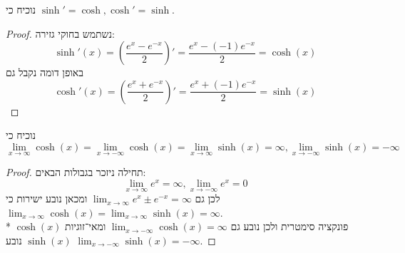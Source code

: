 \Subquestion{}
נוכיח כי $\sinh' = \cosh, \cosh' = \sinh$.
\begin{proof}
	נשתמש בחוקי גזירה:
	\[
		\sinh'(x) = \left( \frac{e^x - e^{-x}}{2}\right)'
		= \frac{e^x - (-1)e^{-x}}{2}
		= \cosh(x)
	\]
	באופן דומה נקבל גם
	\[
		\cosh'(x) = \left( \frac{e^x + e^{-x}}{2}\right)'
		= \frac{e^x + (-1)e^{-x}}{2}
		= \sinh(x)
	\]
\end{proof}

\Subquestion{}
נוכיח כי
\[
	\lim_{x \to \infty} \cosh(x)
	= \lim_{x \to -\infty} \cosh(x)
	= \lim_{x \to \infty} \sinh(x)
	= \infty,
	\lim_{x \to -\infty} \sinh(x)
	= -\infty
\]
\begin{proof}
	תחילה ניזכר בגבולות הבאים:
	\[
		\lim_{x \to \infty} e^x = \infty, \lim_{x \to -\infty} e^x = 0
	\]
	לכן גם $\lim_{x \to \infty} e^x \pm e^{-x} = \infty$ ומכאן נובע ישירות כי $\lim_{x \to \infty} \cosh(x) = \lim_{x \to \infty} \sinh(x) = \infty$. \\*
	$\cosh(x)$ פונקציה סימטרית ולכן נובע גם $\lim_{x \to -\infty} \cosh(x) = \infty$ ומאי־זוגיות $\sinh(x)$ נובע $\lim_{x \to -\infty} \sinh(x) = -\infty$.
\end{proof}


